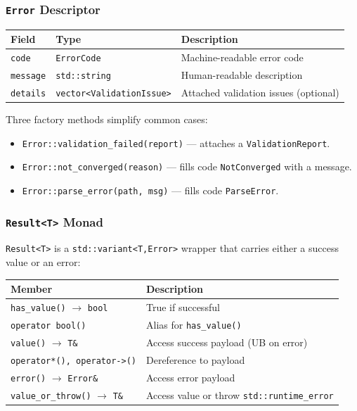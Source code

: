 \subsubsection{\texttt{Error} Descriptor}

\begin{center}
\begin{tabular}{lll}
\hline\hline
\textbf{Field} & \textbf{Type} & \textbf{Description} \\
\hline
\texttt{code} & \texttt{ErrorCode} & Machine-readable error code \\
\texttt{message} & \texttt{std::string} & Human-readable description \\
\texttt{details} & \texttt{vector<ValidationIssue>} & Attached validation issues (optional) \\
\hline\hline
\end{tabular}
\end{center}

Three factory methods simplify common cases:
\begin{itemize}
  \item \texttt{Error::validation\_failed(report)} --- attaches a \texttt{ValidationReport}.
  \item \texttt{Error::not\_converged(reason)} --- fills code \texttt{NotConverged} with a message.
  \item \texttt{Error::parse\_error(path, msg)} --- fills code \texttt{ParseError}.
\end{itemize}

\subsubsection{\texttt{Result<T>} Monad}

\texttt{Result<T>} is a \texttt{std::variant<T,Error>}
wrapper that carries either a success value or an error:

\begin{center}
\begin{tabular}{ll}
\hline\hline
\textbf{Member} & \textbf{Description} \\
\hline
\texttt{has\_value()} $\to$ \texttt{bool} & True if successful \\
\texttt{operator bool()} & Alias for \texttt{has\_value()} \\
\texttt{value()} $\to$ \texttt{T\&} & Access success payload (UB on error) \\
\texttt{operator*(), operator->()} & Dereference to payload \\
\texttt{error()} $\to$ \texttt{Error\&} & Access error payload \\
\texttt{value\_or\_throw()} $\to$ \texttt{T\&} & Access value or throw \texttt{std::runtime\_error} \\
\hline\hline
\end{tabular}
\end{center}

